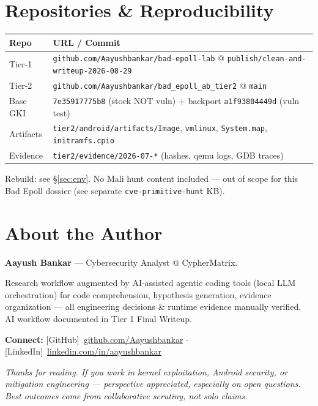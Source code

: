 \documentclass[11pt,a4paper]{article}
\newcommand{\githubicon}{[GitHub]}
\newcommand{\linkedinicon}{[LinkedIn]}
\begin{document}
\section{Repositories \& Reproducibility}
\label{app:repo}
\begin{tabular}{ll}
\toprule
\textbf{Repo} & \textbf{URL / Commit} \\
\midrule
Tier-1 & \texttt{github.com/Aayushbankar/bad-epoll-lab} @ \texttt{publish/clean-and-writeup-2026-08-29} \\
Tier-2 & \texttt{github.com/Aayushbankar/bad\_epoll\_ab\_tier2} @ \texttt{main} \\
Base GKI & \texttt{7e35917775b8} (stock NOT vuln) + backport \texttt{a1f93804449d} (vuln test) \\
Artifacts & \texttt{tier2/android/artifacts/Image}, \texttt{vmlinux}, \texttt{System.map}, \texttt{initramfs.cpio} \\
Evidence & \texttt{tier2/evidence/2026-07-*} (hashes, qemu logs, GDB traces) \\
\bottomrule
\end{tabular}
Rebuild: see \S\ref{sec:env}. No Mali hunt content included — out of scope for this Bad Epoll dossier (see separate \texttt{cve-primitive-hunt} KB).

\newpage

\section{About the Author}

\noindent\textbf{Aayush Bankar} --- Cybersecurity Analyst @ CypherMatrix.

Research workflow augmented by AI-assisted agentic coding tools (local LLM orchestration) for code comprehension, hypothesis generation, evidence organization --- all engineering decisions \& runtime evidence manually verified. AI workflow documented in Tier 1 Final Writeup.

\vspace{1.5em}
\noindent\textbf{Connect:}
\githubicon\ \href{https://github.com/Aayushbankar}{github.com/Aayushbankar} $\cdot$
\linkedinicon\ \href{https://linkedin.com/in/aayushbankar}{linkedin.com/in/aayushbankar}

\vspace{3em}
\begin{center}
{\color{fgmuted}\textit{Thanks for reading. If you work in kernel exploitation, Android security, or mitigation engineering --- perspective appreciated, especially on open questions. Best outcomes come from collaborative scrutiny, not solo claims.}}
\end{center}
\end{document}

